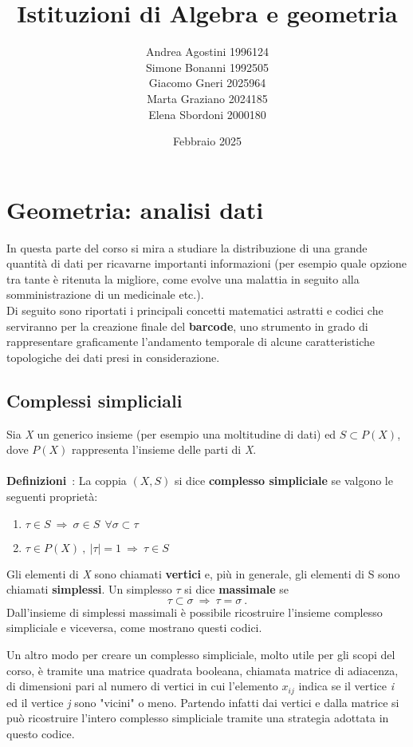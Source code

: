 \documentclass{article}
\title{Istituzioni di Algebra e geometria}
\author{Andrea Agostini 1996124\\ Simone Bonanni 1992505
	\\Giacomo Gneri 2025964
	\\ Marta Graziano 2024185
	\\ Elena Sbordoni 2000180}
\date{Febbraio 2025}
\begin{document}
	
	\maketitle
	\newpage
	\tableofcontents
	\newpage
	\section{Geometria: analisi dati}
	In questa parte del corso si mira a studiare la distribuzione di una grande quantità di dati per ricavarne importanti informazioni (per esempio quale opzione tra tante è ritenuta la migliore, come evolve una malattia in seguito alla somministrazione di un medicinale etc.).\\ Di seguito sono riportati i principali concetti matematici astratti e codici che serviranno per la creazione finale del \textbf{barcode}, uno strumento in grado di rappresentare graficamente l'andamento temporale di alcune caratteristiche topologiche dei dati presi in considerazione.
	
	\subsection{Complessi simpliciali}
	Sia \textit{X} un generico insieme (per esempio una moltitudine di dati) ed \(S\subset P(X)\), dove \(P(X)\) rappresenta l'insieme delle parti di \textit{X}.\\ \\ \textbf{Definizioni}\ : La coppia \((X,S)\) si dice \textbf{complesso simpliciale} se valgono le seguenti proprietà:
	\begin{enumerate}
		\item \(\tau \in S\ \Rightarrow\  \sigma\in S\ \  \forall\sigma\subset\tau\)  
		\item \(\tau\in P(X)\ ,\ |\tau|=1\ \Rightarrow \ \tau\in S\)
	\end{enumerate}
	Gli elementi di \textit{X} sono chiamati \textbf{vertici} e, più in generale, gli elementi di S sono chiamati \textbf{simplessi}. Un simplesso \(\tau\) si dice \textbf{massimale} se \[\tau\subset\sigma \ \Rightarrow\ \tau =\sigma\ .\]
	Dall'insieme di simplessi massimali è possibile ricostruire l'insieme complesso simpliciale e viceversa, come mostrano questi codici.
	\vspace{1cm}
	
	\vspace{1cm}
	
	\vspace{1cm}
	 Un altro modo per creare un complesso simpliciale, molto utile per gli scopi del corso, è tramite una matrice quadrata booleana, chiamata matrice di adiacenza, di dimensioni pari al numero di vertici in cui l'elemento \(x_{ij}\) indica se il vertice \textit{i} ed il vertice \textit{j} sono "vicini" o meno. Partendo infatti dai vertici e dalla matrice si può ricostruire l'intero complesso simpliciale tramite una strategia adottata in questo codice.
	 \vspace{1cm}
	 
	 \vspace{1cm}
\end{document}
